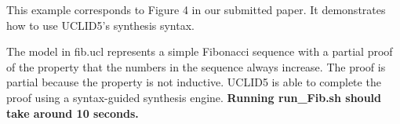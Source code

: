 This example corresponds to Figure 4 in our submitted paper. It demonstrates how to use
UCLID5's synthesis syntax.

The model in fib.ucl represents a simple Fibonacci sequence with a partial
proof of the property that the numbers in the sequence always increase. The
proof is partial because the property is not inductive. UCLID5 is able to
complete the proof using a syntax-guided synthesis engine. \textbf{Running
run\_Fib.sh should take around 10 seconds.}